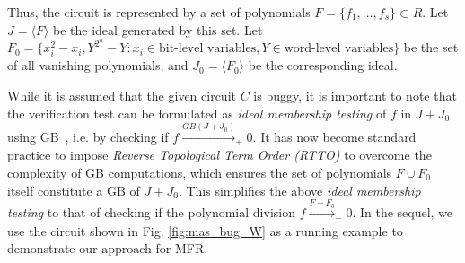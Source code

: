 Thus, the circuit is represented
by a set of polynomials $F=\{f_1,\dots,f_s\} \subset
R$. Let $J =\langle F\rangle$ be the ideal
generated by this set.
Let $F_0 = \{x_i^2-x_i, Y^{2^n}-Y: x_i \in \text{bit-level variables},
Y \in \text{word-level variables}\}$ be the set of all vanishing
polynomials, and $J_0 = \langle F_0\rangle$ be the corresponding ideal. 

While it is assumed that the given circuit $C$ is buggy, it is important 
to note that the verification test can be formulated as {\textit{ideal
membership  testing}} of $f$ in $J+J_0$ using
GB~\cite{lv:tcad2013}, i.e. by  
checking if $f\xrightarrow{GB(J+J_0)}_+0$.
It has now become standard practice to impose {\it Reverse Topological Term Order (RTTO)} to 
overcome the complexity of GB computations, which ensures the set of
polynomials $F\cup F_0$ itself constitute a GB of $J+J_0$. This simplifies
the above {\textit{ideal membership testing}} to that of checking if the polynomial division
$f\xrightarrow{F+F_{0}}_+0$.
In the sequel, we use the circuit shown in
Fig. \ref{fig:mas_bug_W} as a running example to demonstrate our
approach for MFR. 

